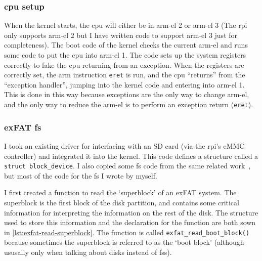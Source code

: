 \documentclass{article}
\begin{document}
\subsubsection{\texorpdfstring{\gls{cpu}}{CPU} setup}
\label{sec:impl_cpu_setup}
When the kernel starts, the \gls{cpu} will either be in \gls{arm-el} 2 or
\gls{arm-el} 3 (The \gls{rpi} only supports \gls{arm-el} 2 but I have written
code to support \gls{arm-el} 3 just for completeness). The boot code of the
kernel checks the current \gls{arm-el} and runs some code to put the \gls{cpu}
into \gls{arm-el} 1. The code sets up the system registers correctly to fake
the \gls{cpu} returning from an exception. When the registers are correctly
set, the \gls{arm} instruction \texttt{eret} is run, and the \gls{cpu}
``returns'' from the ``exception handler'', jumping into the kernel code and
entering into \gls{arm-el} 1. This is done in this way because exceptions are
the only way to change \gls{arm-el}, and the only way to reduce the
\gls{arm-el} is to perform an exception return (\texttt{eret}).

\subsubsection{exFAT \texorpdfstring{\gls{fs}}{Filesystem}}
\label{sec:impl_fs}
I took an existing driver for interfacing with an SD card (via the \gls{rpi}'s
eMMC controller) and integrated it into the kernel. This code defines a
structure called a \verb!struct block_device!. I also copied some \gls{fs} code
from the same related work~\cite{rpi-boot-gh}, but most of the code for the
\gls{fs} I wrote by myself.

I first created a function to read the `superblock' of an exFAT system. The
superblock is the first block of the disk partition, and contains some critical
information for interpreting the information on the rest of the disk. The
structure used to store this information and the declaration for the function
are both sown in \autoref{lst:exfat-read-superblock}. The function is called
\verb!exfat_read_boot_block()! because sometimes the superblock is referred to
as the `boot block' (although ususally only when talking about disks instead of
\glspl{fs}).
\end{document}
